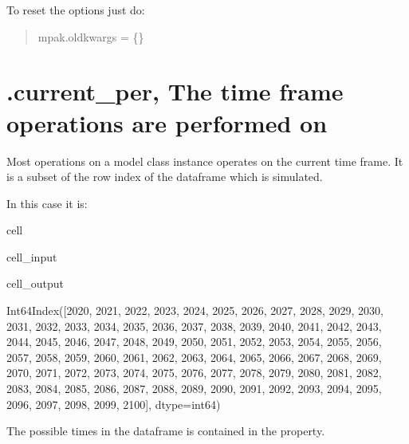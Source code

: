 \documentclass[letterpaper,10pt,english]{jupyterBook}
\begin{document}
\sphinxAtStartPar
To reset the options just do:
\begin{quote}

\sphinxAtStartPar
mpak.oldkwargs = \{\}
\end{quote}


\section{.current\_per, The time frame operations are performed on}
\label{\detokenize{content/notebooks/modelflow_features:current-per-the-time-frame-operations-are-performed-on}}
\sphinxAtStartPar
Most operations on a model class instance operates on the current time frame.
It is a subset of the row index of the dataframe which is simulated.

\sphinxAtStartPar
In this case it is:

\begin{sphinxuseclass}{cell}\begin{sphinxVerbatimInput}

\begin{sphinxuseclass}{cell_input}
\begin{sphinxVerbatim}[commandchars=\\\{\}]
\end{sphinxVerbatim}

\end{sphinxuseclass}\end{sphinxVerbatimInput}
\begin{sphinxVerbatimOutput}

\begin{sphinxuseclass}{cell_output}
\begin{sphinxVerbatim}[commandchars=\\\{\}]
Int64Index([2020, 2021, 2022, 2023, 2024, 2025, 2026, 2027, 2028, 2029, 2030,
            2031, 2032, 2033, 2034, 2035, 2036, 2037, 2038, 2039, 2040, 2041,
            2042, 2043, 2044, 2045, 2046, 2047, 2048, 2049, 2050, 2051, 2052,
            2053, 2054, 2055, 2056, 2057, 2058, 2059, 2060, 2061, 2062, 2063,
            2064, 2065, 2066, 2067, 2068, 2069, 2070, 2071, 2072, 2073, 2074,
            2075, 2076, 2077, 2078, 2079, 2080, 2081, 2082, 2083, 2084, 2085,
            2086, 2087, 2088, 2089, 2090, 2091, 2092, 2093, 2094, 2095, 2096,
            2097, 2098, 2099, 2100],
           dtype=\PYGZsq{}int64\PYGZsq{})
\end{sphinxVerbatim}

\end{sphinxuseclass}\end{sphinxVerbatimOutput}

\end{sphinxuseclass}
\sphinxAtStartPar
The possible times in the dataframe is contained in the  property.
\end{document}
